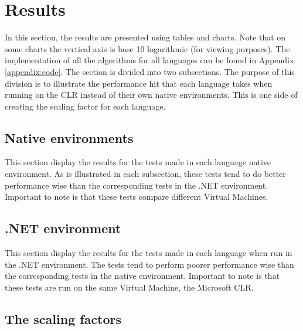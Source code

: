 \section{Results}
In this section, the results are presented using tables and charts. Note that on some charts the vertical axis is base 10 logarithmic (for viewing purposes). The implementation of all the algorithms for all languages can be found in Appendix \ref{appendix:code}. The section is divided into two subsections. The purpose of this division is to illustrate the performance hit that each language takes when running on the CLR instead of their own native environments. This is one side of creating the scaling factor for each language.

\subsection{Native environments}
This section display the results for the tests made in each language native environment. As is illustrated in each subsection, these tests tend to do better performance wise than the corresponding tests in the .NET environment. Important to note is that these tests compare different Virtual Machines.







\subsection{.NET environment}
This section display the results for the tests made in each language when run in the .NET environment. The tests tend to perform poorer performance wise than the corresponding tests in the native environment. Important to note is that these tests are run on the same Virtual Machine, the Microsoft CLR.









\subsection{The scaling factors}

